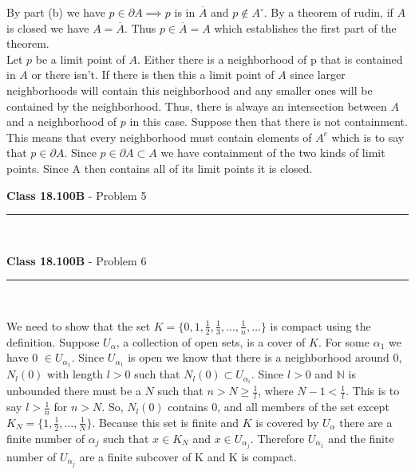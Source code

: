 \documentclass[11pt,reqno]{article}
\begin{document}
By part (b) we have $p \in \partial A \implies p$ is in $\overline{A}$ and $p \notin A^\circ$. By a theorem of rudin, if $A$ is closed we have $A = \overline{A}$. Thus $p \in \overline{A} = A$ which establishes the first part of the theorem.\\ 
\indent Let $p$ be a limit point of $A$. Either there is a neighborhood of p that is contained in $A$ or there isn't. If there is then this a limit point of $A$ since larger neighborhoods will contain this neighborhood and any smaller ones will be contained by the neighborhood. Thus, there is always an intersection between $A$ and a neighborhood of $p$ in this case. Suppose then that there is not containment. This means that every neighborhood must contain elements of $A^c$ which is to say that $p \in \partial A$. Since $p \in \partial A \subset A$ we have containment of the two kinds of limit points. Since A then contains all of its limit points it is closed.

\vspace{15pt}
\begin{flushleft} 
\textbf{Class 18.100B} - Problem 5\\
\rule{500pt}{1pt}\\
\end{flushleft} 


\vspace{15pt}
\begin{flushleft} 
\textbf{Class 18.100B} - Problem 6\\
\rule{500pt}{1pt}\\
\end{flushleft} 

We need to show that the set $K = \{ 0,1,\frac{1}{2}, \frac{1}{3}, \ldots, \frac{1}{n}, \ldots \}$ is compact using the definition. Suppose $U_\alpha$, a collection of open sets, is a cover of $K$. For some $\alpha_1$ we have 0 $\in U_{\alpha_1}$. Since $U_{\alpha_1}$ is open we know that there is  a neighborhood around 0, $N_l(0)$ with length $l > 0$ such that $N_l(0) \subset U_{\alpha_i}$. Since $l > 0$ and $\mathbb{N}$ is unbounded there must be a $N$ such that $n > N \ge \frac{1}{l}$, where $N - 1 < \frac{1}{l}$. This is to say $l > \frac{1}{n}$ for $n > N$. So, $N_l(0)$ contains 0, and all members of the set except $K _N = \{1, \frac{1}{2}, \ldots, \frac{1}{N}\}$. Because this set is finite and $K$ is covered by $U_\alpha$ there are a finite number of $\alpha_j$ such that $x \in K_N$ and $x \in U_{\alpha_j}$.  Therefore $U_{\alpha_1}$ and the finite number of $U_{\alpha_j}$ are a finite subcover of K and K is compact.
\end{document}
